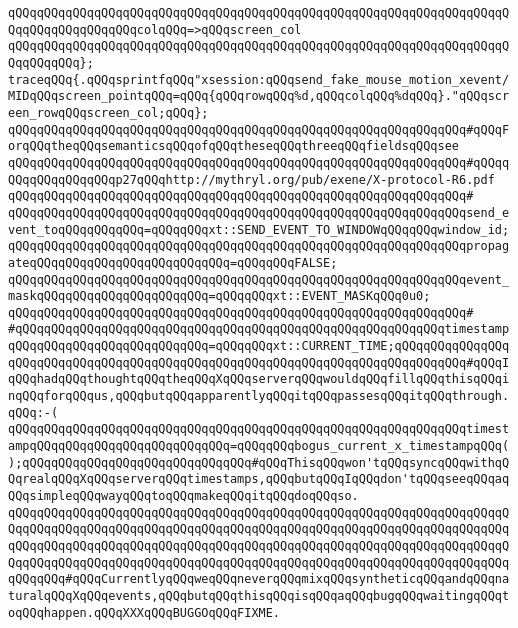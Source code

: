 \verb|qQQqqQQqqQQqqQQqqQQqqQQqqQQqqQQqqQQqqQQqqQQqqQQqqQQqqQQqqQQqqQQqqQQqqQQqqQQqqQQqqQQqqQQqcolqQQq=>qQQqscreen_col|\newline
\verb|qQQqqQQqqQQqqQQqqQQqqQQqqQQqqQQqqQQqqQQqqQQqqQQqqQQqqQQqqQQqqQQqqQQqqQQqqQQqqQQq};|\newline
\newline
\verb|traceqQQq{.qQQqsprintfqQQq"xsession:qQQqsend_fake_mouse_motion_xevent/MIDqQQqscreen_pointqQQq=qQQq{qQQqrowqQQq%d,qQQqcolqQQq%dqQQq}."qQQqscreen_rowqQQqscreen_col;qQQq};|\newline
\verb|qQQqqQQqqQQqqQQqqQQqqQQqqQQqqQQqqQQqqQQqqQQqqQQqqQQqqQQqqQQqqQQq#qQQqForqQQqtheqQQqsemanticsqQQqofqQQqtheseqQQqthreeqQQqfieldsqQQqsee|\newline
\verb|qQQqqQQqqQQqqQQqqQQqqQQqqQQqqQQqqQQqqQQqqQQqqQQqqQQqqQQqqQQqqQQq#qQQqqQQqqQQqqQQqqQQqp27qQQqhttp://mythryl.org/pub/exene/X-protocol-R6.pdf|\newline
\verb|qQQqqQQqqQQqqQQqqQQqqQQqqQQqqQQqqQQqqQQqqQQqqQQqqQQqqQQqqQQqqQQq#|\newline
\verb|qQQqqQQqqQQqqQQqqQQqqQQqqQQqqQQqqQQqqQQqqQQqqQQqqQQqqQQqqQQqqQQqsend_event_toqQQqqQQqqQQq=qQQqqQQqxt::SEND_EVENT_TO_WINDOWqQQqqQQqwindow_id;|\newline
\verb|qQQqqQQqqQQqqQQqqQQqqQQqqQQqqQQqqQQqqQQqqQQqqQQqqQQqqQQqqQQqqQQqpropagateqQQqqQQqqQQqqQQqqQQqqQQqqQQq=qQQqqQQqFALSE;|\newline
\verb|qQQqqQQqqQQqqQQqqQQqqQQqqQQqqQQqqQQqqQQqqQQqqQQqqQQqqQQqqQQqqQQqevent_maskqQQqqQQqqQQqqQQqqQQqqQQq=qQQqqQQqxt::EVENT_MASKqQQq0u0;|\newline
\verb|qQQqqQQqqQQqqQQqqQQqqQQqqQQqqQQqqQQqqQQqqQQqqQQqqQQqqQQqqQQqqQQq#|\newline
\verb|#qQQqqQQqqQQqqQQqqQQqqQQqqQQqqQQqqQQqqQQqqQQqqQQqqQQqqQQqqQQqtimestampqQQqqQQqqQQqqQQqqQQqqQQqqQQq=qQQqqQQqxt::CURRENT_TIME;qQQqqQQqqQQqqQQqqQQqqQQqqQQqqQQqqQQqqQQqqQQqqQQqqQQqqQQqqQQqqQQqqQQqqQQqqQQqqQQq#qQQqIqQQqhadqQQqthoughtqQQqtheqQQqXqQQqserverqQQqwouldqQQqfillqQQqthisqQQqinqQQqforqQQqus,qQQqbutqQQqapparentlyqQQqitqQQqpassesqQQqitqQQqthrough.qQQq:-(|\newline
\verb|qQQqqQQqqQQqqQQqqQQqqQQqqQQqqQQqqQQqqQQqqQQqqQQqqQQqqQQqqQQqqQQqtimestampqQQqqQQqqQQqqQQqqQQqqQQqqQQq=qQQqqQQqbogus_current_x_timestampqQQq();qQQqqQQqqQQqqQQqqQQqqQQqqQQqqQQq#qQQqThisqQQqwon'tqQQqsyncqQQqwithqQQqrealqQQqXqQQqserverqQQqtimestamps,qQQqbutqQQqIqQQqdon'tqQQqseeqQQqaqQQqsimpleqQQqwayqQQqtoqQQqmakeqQQqitqQQqdoqQQqso.|\newline
\verb|qQQqqQQqqQQqqQQqqQQqqQQqqQQqqQQqqQQqqQQqqQQqqQQqqQQqqQQqqQQqqQQqqQQqqQQqqQQqqQQqqQQqqQQqqQQqqQQqqQQqqQQqqQQqqQQqqQQqqQQqqQQqqQQqqQQqqQQqqQQqqQQqqQQqqQQqqQQqqQQqqQQqqQQqqQQqqQQqqQQqqQQqqQQqqQQqqQQqqQQqqQQqqQQqqQQqqQQqqQQqqQQqqQQqqQQqqQQqqQQqqQQqqQQqqQQqqQQqqQQqqQQqqQQqqQQqqQQqqQQqqQQqqQQq#qQQqCurrentlyqQQqweqQQqneverqQQqmixqQQqsyntheticqQQqandqQQqnaturalqQQqXqQQqevents,qQQqbutqQQqthisqQQqisqQQqaqQQqbugqQQqwaitingqQQqtoqQQqhappen.qQQqXXXqQQqBUGGOqQQqFIXME.|\newline
